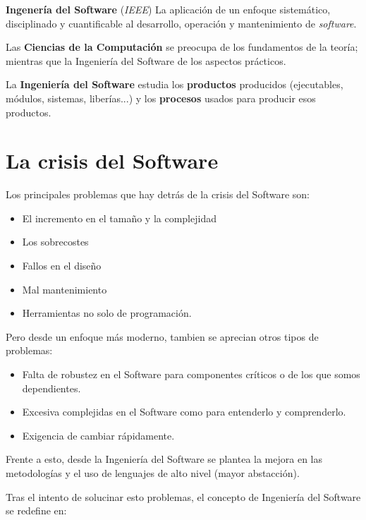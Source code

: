 
\textbf{Ingenería del Software} (\emph{IEEE}) La aplicación de un
enfoque sistemático, disciplinado y cuantificable al desarrollo,
operación y mantenimiento de \emph{software}.\par
Las \textbf{Ciencias de la Computación} se preocupa de los fundamentos
de la teoría; mientras que la Ingeniería del Software de los aspectos
prácticos.\par
La \textbf{Ingeniería del Software} estudia los \textbf{productos}
producidos (ejecutables, módulos, sistemas, liberías...) y los
\textbf{procesos} usados para producir esos productos.

\section{La crisis del Software}
\label{sec:crisis}

Los principales problemas que hay detrás de la crisis del Software
son:
\begin{itemize}[noitemsep]
\item El incremento en el tamaño y la complejidad
\item Los sobrecostes
\item Fallos en el diseño
\item Mal mantenimiento
\item Herramientas no solo de programación.
\end{itemize}

Pero desde un enfoque más moderno, tambien se aprecian otros tipos de
problemas:

\begin{itemize}[noitemsep]
\item Falta de robustez en el Software para componentes críticos o de
  los que somos dependientes.
\item Excesiva complejidas en el Software como para entenderlo y
  comprenderlo.
\item Exigencia de cambiar rápidamente.
\end{itemize}

Frente a esto, desde la Ingeniería del Software se plantea la mejora
en las metodologías y el uso de lenguajes de alto nivel (mayor
abstacción).

Tras el intento de solucinar esto problemas, el concepto de Ingeniería
del Software se redefine en:\par


